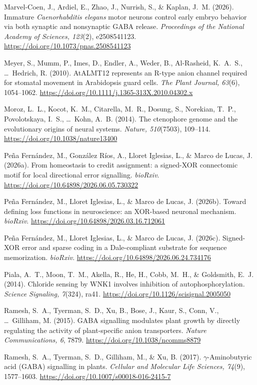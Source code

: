 \documentclass[11pt,a4paper]{article}
\newenvironment{apabib}{\raggedright\begin{list}{}{%
  \setlength{\leftmargin}{1.6em}\setlength{\itemindent}{-1.6em}%
  \setlength{\itemsep}{3pt}\setlength{\parsep}{0pt}\setlength{\topsep}{4pt}}}%
  {\end{list}}
\begin{document}
\begin{apabib}
\item Marvel-Coen, J., Ardiel, E., Zhao, J., Nurrish, S., \& Kaplan, J.~M. (2026). Immature \emph{Caenorhabditis elegans} motor neurons control early embryo behavior via both synaptic and nonsynaptic GABA release. \emph{Proceedings of the National Academy of Sciences, 123}(2), e2508541123. \url{https://doi.org/10.1073/pnas.2508541123}
\item Meyer, S., Mumm, P., Imes, D., Endler, A., Weder, B., Al-Rasheid, K.~A.~S., \ldots\ Hedrich, R. (2010). AtALMT12 represents an R-type anion channel required for stomatal movement in Arabidopsis guard cells. \emph{The Plant Journal, 63}(6), 1054--1062. \url{https://doi.org/10.1111/j.1365-313X.2010.04302.x}
\item Moroz, L.~L., Kocot, K.~M., Citarella, M.~R., Dosung, S., Norekian, T.~P., Povolotskaya, I.~S., \ldots\ Kohn, A.~B. (2014). The ctenophore genome and the evolutionary origins of neural systems. \emph{Nature, 510}(7503), 109--114. \url{https://doi.org/10.1038/nature13400}
\item Pe\~na Fern\'andez, M., Gonz\'alez R\'ios, A., Lloret Iglesias, L., \& Marco de Lucas, J. (2026a). From homeostasis to credit assignment: a signed-XOR connectomic motif for local directional error signalling. \emph{bioRxiv}. \url{https://doi.org/10.64898/2026.06.05.730322}
\item Pe\~na Fern\'andez, M., Lloret Iglesias, L., \& Marco de Lucas, J. (2026b). Toward defining loss functions in neuroscience: an XOR-based neuronal mechanism. \emph{bioRxiv}. \url{https://doi.org/10.64898/2026.03.16.712061}
\item Pe\~na Fern\'andez, M., Lloret Iglesias, L., \& Marco de Lucas, J. (2026c). Signed-XOR error and sparse coding in a Dale-compliant substrate for sequence memorization. \emph{bioRxiv}. \url{https://doi.org/10.64898/2026.06.24.734176}
\item Piala, A.~T., Moon, T.~M., Akella, R., He, H., Cobb, M.~H., \& Goldsmith, E.~J. (2014). Chloride sensing by WNK1 involves inhibition of autophosphorylation. \emph{Science Signaling, 7}(324), ra41. \url{https://doi.org/10.1126/scisignal.2005050}
\item Ramesh, S.~A., Tyerman, S.~D., Xu, B., Bose, J., Kaur, S., Conn, V., \ldots\ Gilliham, M. (2015). GABA signalling modulates plant growth by directly regulating the activity of plant-specific anion transporters. \emph{Nature Communications, 6}, 7879. \url{https://doi.org/10.1038/ncomms8879}
\item Ramesh, S.~A., Tyerman, S.~D., Gilliham, M., \& Xu, B. (2017). $\gamma$-Aminobutyric acid (GABA) signalling in plants. \emph{Cellular and Molecular Life Sciences, 74}(9), 1577--1603. \url{https://doi.org/10.1007/s00018-016-2415-7}

\end{apabib}
\end{document}

